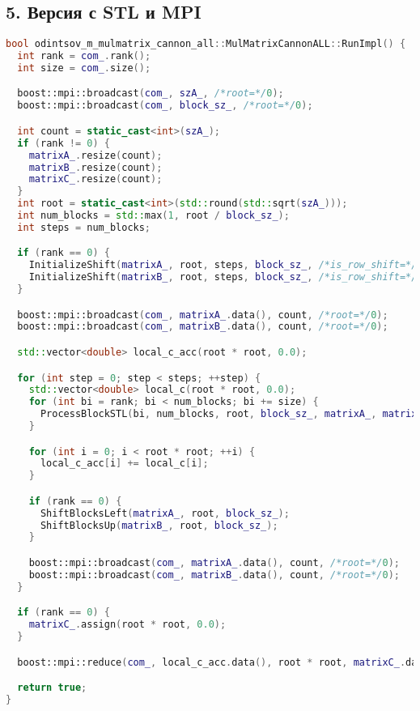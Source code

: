 \documentclass[12pt]{article}
\begin{document}
\subsection*{5. Версия с STL и MPI}
\begin{lstlisting}[language=C++,  breaklines=true]
bool odintsov_m_mulmatrix_cannon_all::MulMatrixCannonALL::RunImpl() {
  int rank = com_.rank();
  int size = com_.size();

  boost::mpi::broadcast(com_, szA_, /*root=*/0);
  boost::mpi::broadcast(com_, block_sz_, /*root=*/0);

  int count = static_cast<int>(szA_);
  if (rank != 0) {
    matrixA_.resize(count);
    matrixB_.resize(count);
    matrixC_.resize(count);
  }
  int root = static_cast<int>(std::round(std::sqrt(szA_)));
  int num_blocks = std::max(1, root / block_sz_);
  int steps = num_blocks;

  if (rank == 0) {
    InitializeShift(matrixA_, root, steps, block_sz_, /*is_row_shift=*/true);
    InitializeShift(matrixB_, root, steps, block_sz_, /*is_row_shift=*/false);
  }

  boost::mpi::broadcast(com_, matrixA_.data(), count, /*root=*/0);
  boost::mpi::broadcast(com_, matrixB_.data(), count, /*root=*/0);

  std::vector<double> local_c_acc(root * root, 0.0);

  for (int step = 0; step < steps; ++step) {
    std::vector<double> local_c(root * root, 0.0);
    for (int bi = rank; bi < num_blocks; bi += size) {
      ProcessBlockSTL(bi, num_blocks, root, block_sz_, matrixA_, matrixB_, local_c);
    }

    for (int i = 0; i < root * root; ++i) {
      local_c_acc[i] += local_c[i];
    }

    if (rank == 0) {
      ShiftBlocksLeft(matrixA_, root, block_sz_);
      ShiftBlocksUp(matrixB_, root, block_sz_);
    }

    boost::mpi::broadcast(com_, matrixA_.data(), count, /*root=*/0);
    boost::mpi::broadcast(com_, matrixB_.data(), count, /*root=*/0);
  }

  if (rank == 0) {
    matrixC_.assign(root * root, 0.0);
  }

  boost::mpi::reduce(com_, local_c_acc.data(), root * root, matrixC_.data(), std::plus<>(), 0);

  return true;
}

\end{lstlisting}
\end{document}
